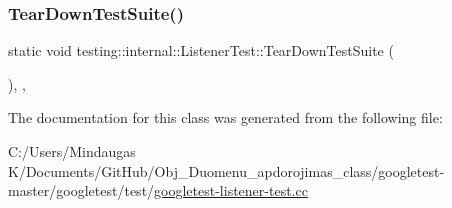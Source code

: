 \mbox{\label{classtesting_1_1internal_1_1_listener_test_a5b4dc58bd218f9893c79c2f2bbd85dd0}} 
\subsubsection{\texorpdfstring{TearDownTestSuite()}{TearDownTestSuite()}\hspace{0.1cm}{\footnotesize\ttfamily [2/2]}}
{\footnotesize\ttfamily static void testing\+::internal\+::\+Listener\+Test\+::\+Tear\+Down\+Test\+Suite (\begin{DoxyParamCaption}{ }\end{DoxyParamCaption})\hspace{0.3cm}{\ttfamily [inline]}, {\ttfamily [static]}, {\ttfamily [protected]}}



The documentation for this class was generated from the following file\+:\begin{DoxyCompactItemize}
\item 
C\+:/\+Users/\+Mindaugas K/\+Documents/\+Git\+Hub/\+Obj\+\_\+\+Duomenu\+\_\+apdorojimas\+\_\+class/googletest-\/master/googletest/test/\mbox{\hyperlink{googletest-master_2googletest_2test_2googletest-listener-test_8cc}{googletest-\/listener-\/test.\+cc}}\end{DoxyCompactItemize}
